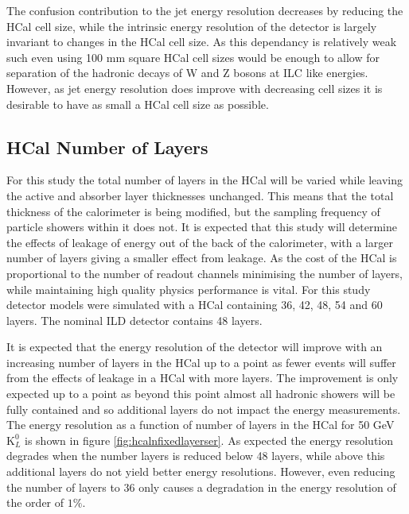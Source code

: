 The confusion contribution to the jet energy resolution decreases by reducing the HCal cell size, while the intrinsic energy resolution of the detector is largely invariant to changes in the HCal cell size.  As this dependancy is relatively weak such even using 100 mm square HCal cell sizes would be enough to allow for separation of the hadronic decays of W and Z bosons at ILC like energies.  However, as jet energy resolution does improve with decreasing cell sizes it is desirable to have as small a HCal cell size as possible.


\subsection{HCal Number of Layers}
\label{sec:hcalnlayers}
For this study the total number of layers in the HCal will be varied while leaving the active and absorber layer thicknesses unchanged.  This means that the total thickness of the calorimeter is being modified, but the sampling frequency of particle showers within it does not.  It is expected that this study will determine the effects of leakage of energy out of the back of the calorimeter, with a larger number of layers giving a smaller effect from leakage.  As the cost of the HCal is proportional to the number of readout channels minimising the number of layers, while maintaining high quality physics performance is vital.  For this study detector models were simulated with a HCal containing 36, 42, 48, 54 and 60 layers.  The nominal ILD detector contains 48 layers.

It is expected that the energy resolution of the detector will improve with an increasing number of layers in the HCal up to a point as fewer events will suffer from the effects of leakage in a HCal with more layers.  The improvement is only expected up to a point as beyond this point almost all hadronic showers will be fully contained and so additional layers do not impact the energy measurements.  The energy resolution as a function of number of layers in the HCal for 50 GeV $\text{K}^{0}_{L}$ is shown in figure \ref{fig:hcalnfixedlayerser}.  As expected the energy resolution degrades when the number layers is reduced below 48 layers, while above this additional layers do not yield better energy resolutions.  However, even reducing the number of layers to 36 only causes a degradation in the energy resolution of the order of $1\%$.  

